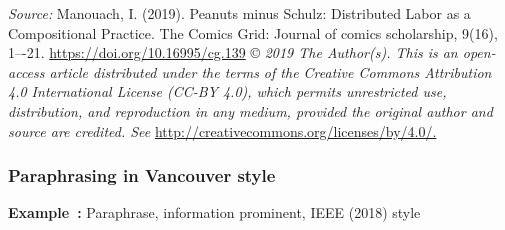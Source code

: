 \documentclass[english, 12pt, a4paper, biz, utf8, a-2b, online]{aaltothesis}
\begin{document}
\vspace{1ex}
\noindent
{}

\vspace{1ex}
\noindent
\textit{Source:} Manouach, I. (2019). Peanuts minus Schulz: Distributed Labor as
a Compositional Practice. The Comics Grid: Journal of comics scholarship, 9(16), 
1–-21. \url{https://doi.org/10.16995/cg.139} \copyright{}
\textit{2019 The Author(s). This is an open-access article distributed under the
	terms of the Creative Commons Attribution 4.0 International License (CC-BY 
	4.0), which permits unrestricted use, distribution, and reproduction in any 
	medium, provided the original author and source are credited. See}
 \url{http://creativecommons.org/licenses/by/4.0/.}


\subsubsection*{Paraphrasing in Vancouver style}

\textsf{\textbf{Example~\theexample:}} Paraphrase, information prominent, IEEE 
(2018) style
\end{document}

